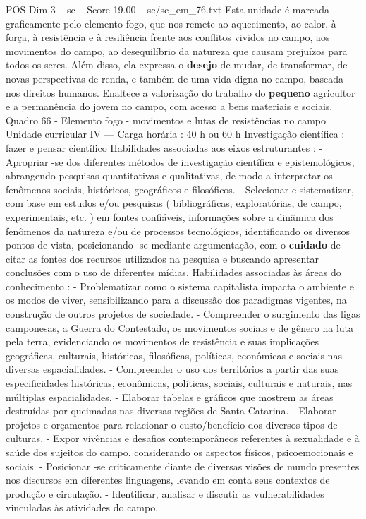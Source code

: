 \begin{textsample}{POS Dim 3 – sc – Score 19.00 – sc/sc\_em\_76.txt}
Esta unidade é marcada graficamente pelo elemento fogo, que nos remete ao aquecimento, ao calor, à força, à resistência e à resiliência frente aos conflitos vividos no campo, aos movimentos do campo, ao desequilíbrio da natureza que causam prejuízos para todos os seres.
Além disso, ela expressa o \textbf{desejo} de mudar, de transformar, de novas perspectivas de renda, e também de uma vida digna no campo, baseada nos direitos humanos.
Enaltece a valorização do trabalho do \textbf{pequeno} agricultor e a permanência do jovem no campo, com acesso a bens materiais e sociais.
Quadro 66 - Elemento fogo - movimentos e lutas de resistências no campo Unidade curricular IV — Carga horária : 40 h ou 60 h Investigação científica : fazer e pensar científico Habilidades associadas aos eixos estruturantes : - Apropriar -se dos diferentes métodos de investigação científica e epistemológicos, abrangendo pesquisas quantitativas e qualitativas, de modo a interpretar os fenômenos sociais, históricos, geográficos e filosóficos. - Selecionar e sistematizar, com base em estudos e/ou pesquisas ( bibliográficas, exploratórias, de campo, experimentais, etc. ) em fontes confiáveis, informações sobre a dinâmica dos fenômenos da natureza e/ou de processos tecnológicos, identificando os diversos pontos de vista, posicionando -se mediante argumentação, com o \textbf{cuidado} de citar as fontes dos recursos utilizados na pesquisa e buscando apresentar conclusões com o uso de diferentes mídias.
Habilidades associadas às áreas do conhecimento : - Problematizar como o sistema capitalista impacta o ambiente e os modos de viver, sensibilizando para a discussão dos paradigmas vigentes, na construção de outros projetos de sociedade. - Compreender o surgimento das ligas camponesas, a Guerra do Contestado, os movimentos sociais e de gênero na luta pela terra, evidenciando os movimentos de resistência e suas implicações geográficas, culturais, históricas, filosóficas, políticas, econômicas e sociais nas diversas espacialidades. - Compreender o uso dos territórios a partir das suas especificidades históricas, econômicas, políticas, sociais, culturais e naturais, nas múltiplas espacialidades. - Elaborar tabelas e gráficos que mostrem as áreas destruídas por queimadas nas diversas regiões de Santa Catarina. - Elaborar projetos e orçamentos para relacionar o custo/benefício dos diversos tipos de culturas. - Expor vivências e desafios contemporâneos referentes à sexualidade e à saúde dos sujeitos do campo, considerando os aspectos físicos, psicoemocionais e sociais. - Posicionar -se criticamente diante de diversas visões de mundo presentes nos discursos em diferentes linguagens, levando em conta seus contextos de produção e circulação. - Identificar, analisar e discutir as vulnerabilidades vinculadas às atividades do campo.

\end{textsample}
